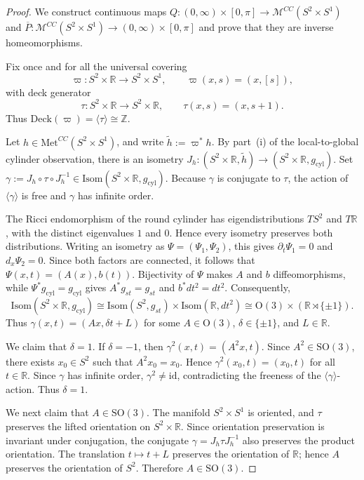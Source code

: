 \documentclass[10pt,a4paper]{amsart}
\begin{document}
\begin{proof}
We construct continuous maps
\(Q\colon(0,\infty)\times[0,\pi]\to  \mathcal{M}^{CC}(S^2\times S^1)\)
and
\(\overline P\colon\mathcal{M}^{CC}(S^2\times S^1)\to (0,\infty)\times[0,\pi]\)
and prove that they are inverse homeomorphisms.

Fix once and for all the universal covering
\[
\varpi\colon S^2\times \mathbb R\longrightarrow S^2\times S^1,
\qquad
\varpi(x,s)=(x,[s]),
\]
with deck generator
\[
\tau\colon S^2\times \mathbb R\longrightarrow S^2\times \mathbb R,
\qquad
\tau(x,s)=(x,s+1).
\]
Thus \(\mathrm{Deck}(\varpi)=\langle \tau\rangle\cong \mathbb Z\).

Let \(h\in \mathrm{Met}^{CC}(S^2\times S^1)\), and write
$\widetilde h:=\varpi^*h$. By part~(i) of the local-to-global cylinder
observation, there is an isometry
\(J_h\colon(S^2\times\mathbb R,\widetilde h)
\to (S^2\times\mathbb R,g_{\mathrm{cyl}})\).
Set
\(\gamma:=J_h\circ\tau\circ J_h^{-1}
\in\mathrm{Isom}(S^2\times\mathbb R,g_{\mathrm{cyl}})\).
Because \(\gamma\) is conjugate to \(\tau\), the action of \(\langle\gamma\rangle\) is free and \(\gamma\) has infinite order.

The Ricci endomorphism of the round cylinder has eigendistributions $TS^2$
and $T\mathbb R$, with the distinct eigenvalues $1$ and $0$. Hence every
isometry preserves both distributions. Writing an isometry as
$\Psi=(\Psi_1,\Psi_2)$, this gives $\partial_t\Psi_1=0$ and
$d_x\Psi_2=0$. Since both factors are connected, it follows that
$\Psi(x,t)=(A(x),b(t))$. Bijectivity of $\Psi$ makes $A$ and $b$
diffeomorphisms, while $\Psi^*g_{\mathrm{cyl}}=g_{\mathrm{cyl}}$ gives
$A^*g_{st}=g_{st}$ and $b^*dt^2=dt^2$. Consequently,
\[
\mathrm{Isom}(S^2\times \mathbb R, g_{\mathrm{cyl}})
\cong \mathrm{Isom}(S^2, g_{st}) \times \mathrm{Isom}(\mathbb{R}, dt^2)
\cong \mathrm{O}(3) \times (\mathbb{R} \rtimes \{\pm 1\}).
\]
Thus
\(
\gamma(x,t)=(Ax,\delta t+L)
\)
for some $A\in\mathrm{O}(3)$, $\delta\in\{\pm1\}$, and $L\in\mathbb R$.


We claim that \(\delta=1\). If \(\delta=-1\), then
$\gamma^2(x,t)=(A^2x,t)$.
Since \(A^2\in \mathrm{SO}(3)\), there exists \(x_0\in S^2\) such that
\(A^2x_0=x_0\). Hence $\gamma^2(x_0,t)=(x_0,t)$ for all $t\in\mathbb R$.
Since \(\gamma\) has infinite order, \(\gamma^2\neq\mathrm{id}\), contradicting
the freeness of the \(\langle\gamma\rangle\)-action. Thus \(\delta=1\).

We next claim that \(A\in \mathrm{SO}(3)\). The manifold
\(S^2\times S^1\) is oriented, and \(\tau\) preserves the lifted orientation
on \(S^2\times\mathbb R\). Since orientation preservation is invariant under
conjugation, the conjugate $\gamma=J_h\tau J_h^{-1}$ also preserves the product orientation.
The translation \(t\mapsto t+L\) preserves the orientation of $\mathbb R$;
hence $A$ preserves the orientation of $S^2$. Therefore
$A\in\mathrm{SO}(3)$.


\end{proof}
\end{document}
